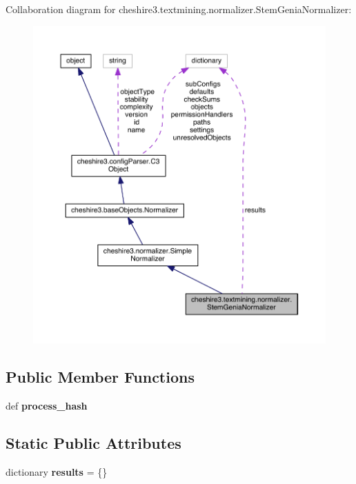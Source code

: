 Collaboration diagram for cheshire3.\-textmining.\-normalizer.\-Stem\-Genia\-Normalizer\-:
\nopagebreak
\begin{figure}[H]
\begin{center}
\leavevmode
\includegraphics[width=350pt]{classcheshire3_1_1textmining_1_1normalizer_1_1_stem_genia_normalizer__coll__graph}
\end{center}
\end{figure}
\subsection*{Public Member Functions}
\begin{DoxyCompactItemize}
\item 
\hypertarget{classcheshire3_1_1textmining_1_1normalizer_1_1_stem_genia_normalizer_a459c981fffaf9864caaa7b5a2587ea88}{def {\bfseries process\-\_\-hash}}\label{classcheshire3_1_1textmining_1_1normalizer_1_1_stem_genia_normalizer_a459c981fffaf9864caaa7b5a2587ea88}

\end{DoxyCompactItemize}
\subsection*{Static Public Attributes}
\begin{DoxyCompactItemize}
\item 
\hypertarget{classcheshire3_1_1textmining_1_1normalizer_1_1_stem_genia_normalizer_a0b7b4a8947d5edc94fd66e5c19b66245}{dictionary {\bfseries results} = \{\}}\label{classcheshire3_1_1textmining_1_1normalizer_1_1_stem_genia_normalizer_a0b7b4a8947d5edc94fd66e5c19b66245}

\end{DoxyCompactItemize}
